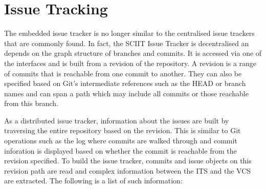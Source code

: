 \documentclass{mproj}
\begin{document}


\section{Issue Tracking}

The embedded issue tracker is no longer similar to the centralised issue trackers that are commonly found. In fact, the SCIIT Issue Tracker is decentralised an depends on the graph structure of branches and commits. It is accessed via one of the interfaces and is built from a revision of the repository. A revision is a range of commits that is reachable from one commit to another. They can also be specified based on Git's intermediate references such as the HEAD or branch names and can span a path which may include all commits or those reachable from this branch.

As a distributed issue tracker, information about the issues are built by traversing the entire repository based on the revision. This is similar to Git operations such as the log where commits are walked through and commit inforation is displayed based on whether the commit is reachable from the revision specified. To build the issue tracker, commits and issue objects on this revision path are read and complex information between the ITS and the VCS are extracted. The following is a list of such information:
\end{document}
